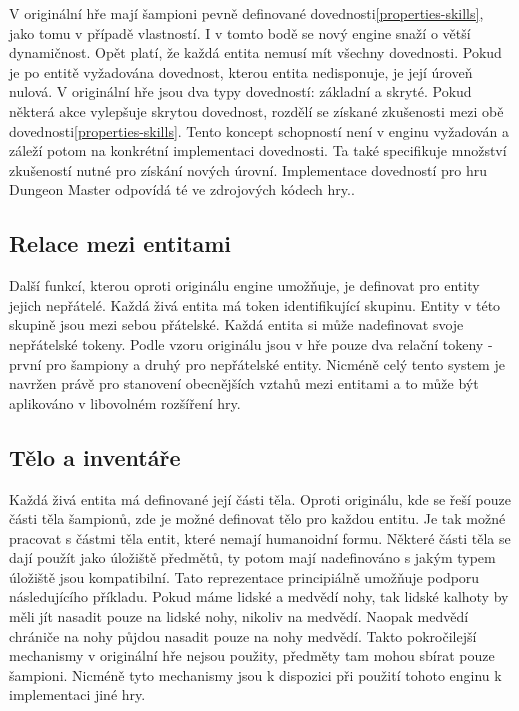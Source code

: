 V originální hře mají šampioni pevně definované dovednosti\vref{properties-skills}, jako tomu v případě vlastností.
I v tomto bodě se nový engine snaží o větší dynamičnost. Opět platí, že každá entita nemusí mít všechny dovednosti.
Pokud je po entitě vyžadována dovednost, kterou entita nedisponuje, je její úroveň nulová.
V originální hře jsou dva typy dovedností: základní a skryté. Pokud některá akce vylepšuje skrytou dovednost,
rozdělí se získané zkušenosti mezi obě dovednosti\vref{properties-skills}. Tento koncept schopností není v enginu vyžadován a 
záleží potom na konkrétní implementaci dovednosti. Ta také specifikuje množství zkušeností nutné pro 
získání nových úrovní. Implementace dovedností pro hru Dungeon Master odpovídá té ve zdrojových kódech hry.\cite{DMDecompilation}.

\subsection{Relace mezi entitami}
Další funkcí, kterou oproti originálu engine umožňuje, je definovat pro entity jejich nepřátelé. Každá živá entita má token identifikující
skupinu. Entity v této skupině jsou mezi sebou přátelské. Každá entita si může nadefinovat svoje nepřátelské tokeny.
Podle vzoru originálu jsou v hře pouze dva relační tokeny - první pro šampiony a druhý pro nepřátelské entity. Nicméně
celý tento system je navržen právě pro stanovení obecnějších vztahů mezi entitami a to může být aplikováno v libovolném rozšíření hry.
 
\subsection{Tělo a inventáře}
Každá živá entita má definované její části těla. Oproti originálu, kde se řeší pouze části těla šampionů,
zde je možné definovat tělo pro každou entitu. Je tak možné pracovat s částmi těla entit, které nemají humanoidní formu.
Některé části těla se dají použít jako úložiště předmětů, ty potom mají nadefinováno s jakým typem úložiště jsou kompatibilní.
Tato reprezentace principiálně umožňuje podporu následujícího příkladu. Pokud máme lidské a medvědí nohy, tak lidské
kalhoty by měli jít nasadit pouze na lidské nohy, nikoliv na medvědí. Naopak medvědí chrániče na nohy půjdou nasadit pouze na
nohy medvědí. Takto pokročilejší mechanismy v originální hře nejsou použity, předměty tam mohou sbírat pouze šampioni. Nicméně
tyto mechanismy jsou k dispozici při použití tohoto enginu k implementaci jiné hry.

